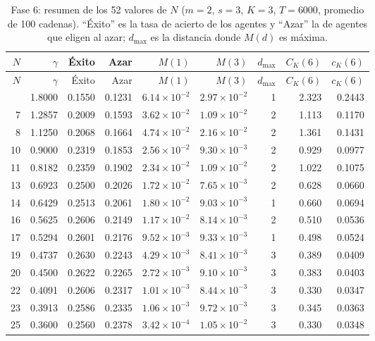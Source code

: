 \documentclass[11pt,letterpaper]{article}
\begin{document}
\begin{small}
\begin{longtable}{rrrrrrrrr}
\caption{Fase 6: resumen de los 52 valores de $N$ ($m=2$, $s=3$, $K=3$, $T=6000$, promedio de 100 cadenas). ``Éxito'' es la tasa de acierto de los agentes y ``Azar'' la de agentes que eligen al azar; $d_{\max}$ es la distancia donde $M(d)$ es máxima.}\label{tab:f6}\\
\toprule
$N$ & $\gamma$ & Éxito & Azar & $M(1)$ & $M(3)$ & $d_{\max}$ & $C_K(6)$ & $c_K(6)$ \\
\midrule
\endfirsthead
\toprule
$N$ & $\gamma$ & Éxito & Azar & $M(1)$ & $M(3)$ & $d_{\max}$ & $C_K(6)$ & $c_K(6)$ \\
\midrule
\endhead
\bottomrule
\endfoot
5 & 1.8000 & 0.1550 & 0.1231 & $6.14\times10^{-2}$ & $2.97\times10^{-2}$ & 1 & 2.323 & 0.2443 \\
7 & 1.2857 & 0.2009 & 0.1593 & $3.62\times10^{-2}$ & $1.09\times10^{-2}$ & 2 & 1.113 & 0.1170 \\
8 & 1.1250 & 0.2068 & 0.1664 & $4.74\times10^{-2}$ & $2.16\times10^{-2}$ & 2 & 1.361 & 0.1431 \\
10 & 0.9000 & 0.2319 & 0.1853 & $2.56\times10^{-2}$ & $9.30\times10^{-3}$ & 2 & 0.929 & 0.0977 \\
11 & 0.8182 & 0.2359 & 0.1902 & $2.34\times10^{-2}$ & $1.09\times10^{-2}$ & 2 & 1.022 & 0.1075 \\
13 & 0.6923 & 0.2500 & 0.2026 & $1.72\times10^{-2}$ & $7.65\times10^{-3}$ & 2 & 0.628 & 0.0660 \\
14 & 0.6429 & 0.2513 & 0.2061 & $1.80\times10^{-2}$ & $9.03\times10^{-3}$ & 1 & 0.660 & 0.0694 \\
16 & 0.5625 & 0.2606 & 0.2149 & $1.17\times10^{-2}$ & $8.14\times10^{-3}$ & 2 & 0.510 & 0.0536 \\
17 & 0.5294 & 0.2601 & 0.2176 & $9.52\times10^{-3}$ & $9.33\times10^{-3}$ & 1 & 0.498 & 0.0524 \\
19 & 0.4737 & 0.2630 & 0.2243 & $4.29\times10^{-3}$ & $8.41\times10^{-3}$ & 3 & 0.389 & 0.0409 \\
20 & 0.4500 & 0.2622 & 0.2265 & $2.72\times10^{-3}$ & $9.10\times10^{-3}$ & 3 & 0.383 & 0.0403 \\
22 & 0.4091 & 0.2606 & 0.2317 & $1.01\times10^{-3}$ & $8.44\times10^{-3}$ & 3 & 0.330 & 0.0347 \\
23 & 0.3913 & 0.2586 & 0.2335 & $1.06\times10^{-3}$ & $9.72\times10^{-3}$ & 3 & 0.345 & 0.0363 \\
25 & 0.3600 & 0.2560 & 0.2378 & $3.42\times10^{-4}$ & $1.05\times10^{-2}$ & 3 & 0.330 & 0.0348 \\

\end{longtable}
\end{small}
\end{document}
